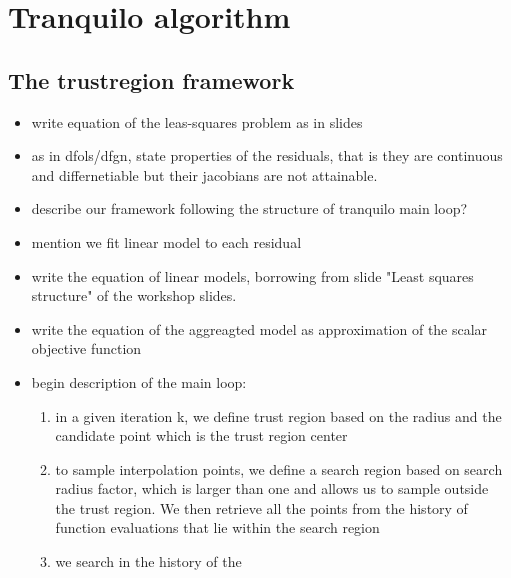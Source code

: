 \section{Tranquilo algorithm}
\label{sec:algo-framework}
\subsection{The trustregion framework}
\label{subsec:tr-framework}
\begin{itemize}
    \item write equation of the leas-squares problem as in slides
    \item as in dfols/dfgn, state properties of the residuals, that is they are continuous and differnetiable but their jacobians are not attainable.
    \item describe our framework following the structure of tranquilo main loop?
    \item mention we fit linear model to each residual
    \item write the equation of linear models, borrowing from slide "Least squares structure" of the workshop slides.
    \item write the equation of the aggreagted model as approximation of the scalar objective function
    \item begin description of the main loop:
        \begin{enumerate}
            \item in a given iteration k, we define trust region based on the radius and the candidate point which is the trust region center
            \item to sample interpolation points, we define a search region based on search radius factor, which is larger than one and allows us to sample outside the trust region. We then retrieve all the points from the history of function evaluations that lie within the search region
            \item we search in the history of the
        \end{enumerate}
\end{itemize}
